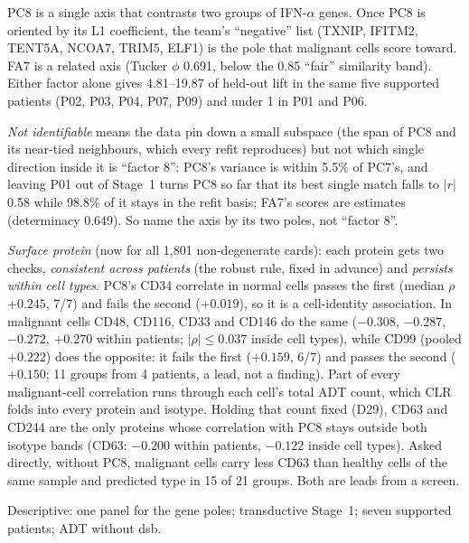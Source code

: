 \begin{answerbox}
PC8 is a single axis that contrasts two groups of IFN-$\alpha$ genes. Once PC8 is oriented by its L1 coefficient, the team's ``negative'' list (TXNIP, IFITM2, TENT5A, NCOA7, TRIM5, ELF1) is the pole that malignant cells score toward. FA7 is a related axis (Tucker $\phi$ 0.691, below the 0.85 ``fair'' similarity band). Either factor alone gives 4.81--19.87\pp{} of held-out lift in the same five supported patients (P02, P03, P04, P07, P09) and under 1\pp{} in P01 and P06.

\emph{Not identifiable} means the data pin down a small subspace (the span of PC8 and its near-tied neighbours, which every refit reproduces) but not which single direction inside it is ``factor 8'': PC8's variance is within 5.5\% of PC7's, and leaving P01 out of Stage~1 turns PC8 so far that its best single match falls to $|r|$ 0.58 while 98.8\% of it stays in the refit basis; FA7's scores are estimates (determinacy 0.649). So name the axis by its two poles, not ``factor 8''.

\emph{Surface protein} (now for all 1,801 non-degenerate cards): each protein gets two checks, \emph{consistent across patients} (the robust rule, fixed in advance) and \emph{persists within cell types}. PC8's CD34 correlate in normal cells passes the first (median $\rho$ $+0.245$, 7/7) and fails the second ($+0.019$), so it is a cell-identity association. In malignant cells CD48, CD116, CD33 and CD146 do the same ($-0.308$, $-0.287$, $-0.272$, $+0.270$ within patients; $|\rho| \leq 0.037$ inside cell types), while CD99 (pooled $+0.222$) does the opposite: it fails the first ($+0.159$, 6/7) and passes the second ($+0.150$; 11 groups from 4 patients, a lead, not a finding). Part of every malignant-cell correlation runs through each cell's total ADT count, which CLR folds into every protein and isotype. Holding that count fixed (D29), CD63 and CD244 are the only proteins whose correlation with PC8 stays outside both isotype bands (CD63: $-0.200$ within patients, $-0.122$ inside cell types). Asked directly, without PC8, malignant cells carry less CD63 than healthy cells of the same sample and predicted type in 15 of 21 groups. Both are leads from a screen.

Descriptive: one panel for the gene poles; transductive Stage~1; seven supported patients; ADT without dsb.
\end{answerbox}

